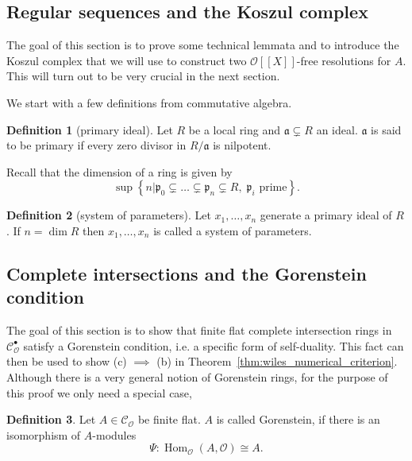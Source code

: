 \documentclass{article}
\theoremstyle{plain}%
\theoremstyle{definition}
\newtheorem{definition}{Definition}[section]
\theoremstyle{remark}
\newcommand{\cob}{\mathcal{C}_\mathcal{O}^\bullet}
\newcommand{\co}{\mathcal{C}_\mathcal{O}}
\renewcommand{\hom}{\operatorname{Hom}}
\begin{document}
    \subsection{Regular sequences and the Koszul complex}
    The goal of this section is to prove some technical lemmata and to introduce
    the Koszul complex that we will use to construct two \(\mathcal{O}[[X]]\)-free resolutions for \(A\).
    This will turn out to be very crucial in the next section.

    We start with a few definitions from commutative algebra.
    \begin{definition}[primary ideal]
        Let \(R\) be a local ring and \(\mathfrak{a} \subsetneq R\) an ideal. 
        \(\mathfrak{a}\) is said to be primary if every zero divisor in \(R/\mathfrak{a}\) is nilpotent.
    \end{definition}
    Recall that the dimension of a ring is given by
    \[
        \sup \left\{n | 
                    \mathfrak{p}_0 \subsetneq \dots \subsetneq \mathfrak{p}_n \subsetneq R,\; \mathfrak{p}_i \text{ prime} 
            \right\}.
    \]
    \begin{definition}[system of parameters]
        Let \(x_1, \dots, x_n\) generate a primary ideal of \(R\). If \(n = \dim R\) then \(x_1, \dots, x_n\) is called 
        a system of parameters.
    \end{definition}
    

    \subsection{Complete intersections and the Gorenstein condition}
    The goal of this section is to show that finite flat complete intersection rings in \(\cob\) 
    satisfy a Gorenstein condition, i.e. a specific form of self-duality.
    This fact can then be used to show (c) \(\implies\) (b) in Theorem~\ref{thm:wiles_numerical_criterion}.
    Although there is a very general notion of Gorenstein rings, for
    the purpose of this proof we only need a special case,
    \begin{definition}
        Let \(A \in \co\) be finite flat. \(A\) is called Gorenstein, if there is an isomorphism of \(A\)-modules
        \[
            \Psi\colon \hom_\mathcal{O}(A, \mathcal{O}) \cong A.
        \]
    \end{definition}
    
\end{document}
